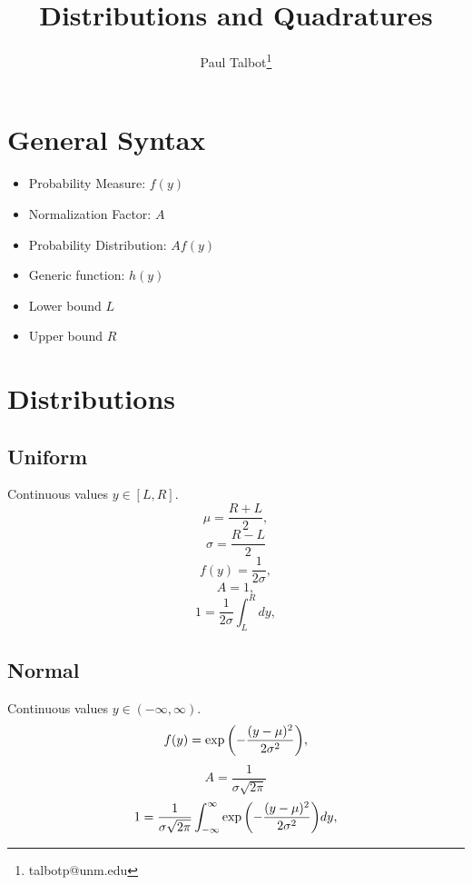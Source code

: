 \documentclass[11pt]{article}
\begin{document}
\title{Distributions and Quadratures}

\author[]{Paul Talbot\thanks{talbotp@unm.edu}}
\renewcommand\Authands{ and }
\maketitle

\section{General Syntax}
\begin{itemize}
\item Probability Measure: $f(y)$
\item Normalization Factor: $A$
\item Probability Distribution: $Af(y)$
\item Generic function: $h(y)$
\item Lower bound $L$
\item Upper bound $R$
\end{itemize}
\newpage

\section{Distributions}
\subsection{Uniform}
Continuous values $y\in[L,R]$.
\begin{equation}
\mu = \frac{R+L}{2},
\end{equation}
\begin{equation}
\sigma = \frac{R-L}{2}
\end{equation}
\begin{equation}
f(y) = \frac{1}{2\sigma},
\end{equation}
\begin{equation}
A=1,
\end{equation}
\begin{equation}
  1 = \frac{1}{2\sigma}\int_L^R dy,
\end{equation}

\subsection{Normal}
Continuous values $y\in(-\infty,\infty)$.
\begin{equation}
f(y) = \exp\qty(-\frac{(y-\mu)^2}{2\sigma^2}),
\end{equation}
\begin{equation}
A = \frac{1}{\sigma\sqrt{2\pi}}
\end{equation}
\begin{equation}
  1 =\frac{1}{\sigma\sqrt{2\pi}} \int_{-\infty}^\infty \exp\qty( -\frac{(y-\mu)^2}{2\sigma^2} )dy,
\end{equation}
\end{document}
